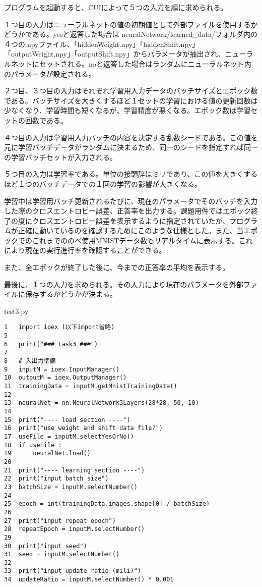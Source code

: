 \documentclass{ujarticle} %
\begin{document}
プログラムを起動すると、CUIによって５つの入力を順に求められる。

１つ目の入力はニューラルネットの値の初期値として外部ファイルを使用するかどうかである。yesと返答した場合は neuralNetwork/learned_data/フォルダ内の４つの.npyファイル、「hiddenWeight.npy」「hiddenShift.npy」「outputWeight.npy」「outputShift.npy」からパラメータが抽出され、ニューラルネットにセットされる。noと返答した場合はランダムにニューラルネット内のパラメータが設定される。

２つ目、３つ目の入力はそれぞれ学習用入力データのバッチサイズとエポック数である。バッチサイズを大きくするほど１セットの学習における値の更新回数は少なくなり、学習時間も短くなるが、学習精度が悪くなる。エポック数は学習セットの回数である。

４つ目の入力は学習用入力バッチの内容を決定する乱数シードである。この値を元に学習バッチデータがランダムに決まるため、同一のシードを指定すれば同一の学習バッチセットが入力される。

５つ目の入力は学習率である。単位の接頭辞はミリであり、この値を大きくするほど１つのバッチデータでの１回の学習の影響が大きくなる。

学習中は学習用バッチ更新されるたびに、現在のパラメータでそのバッチを入力した際のクロスエントロピー誤差、正答率を出力する。課題用件ではエポック終了の度にクロスエントロピー誤差を表示するように指定されていたが、プログラムが正確に動いているのを確認するためにこのような仕様とした。また、当エポックでのこれまでののべ使用MNISTデータ数もリアルタイムに表示する。これにより現在の実行進行率を確認することができる。

また、全エポックが終了した後に、今までの正答率の平均を表示する。

最後に、１つの入力を求められる。その入力により現在のパラメータを外部ファイルに保存するかどうかが決まる。

\begin{itembox}[l]{test3.py}
  \begin{verbatim}
1   import ioex (以下import省略)
5
6   print("### task3 ###")
7
8   # 入出力準備
9   inputM = ioex.InputManager()
10  outputM = ioex.OutputManager()
11  trainingData = inputM.getMnistTrainingData()
12
13  neuralNet = nn.NeuralNetwork3Layers(28*28, 50, 10)
14
15  print("---- load section ----")
16  print("use weight and shift data file?")
17  useFile = inputM.selectYesOrNo()
18  if useFile :
19      neuralNet.load()
20
21  print("---- learning section ----")
22  print("input batch size")
23  batchSize = inputM.selectNumber()
24
25  epoch = int(trainingData.images.shape[0] / batchSize)
26
27  print("input repeat epoch")
28  repeatEpoch = inputM.selectNumber()
29
30  print("input seed")
31  seed = inputM.selectNumber()
32
33  print("input update ratio (mili)")
34  updateRatio = inputM.selectNumber() * 0.001
\end{verbatim}
\end{itembox}
\end{document}
